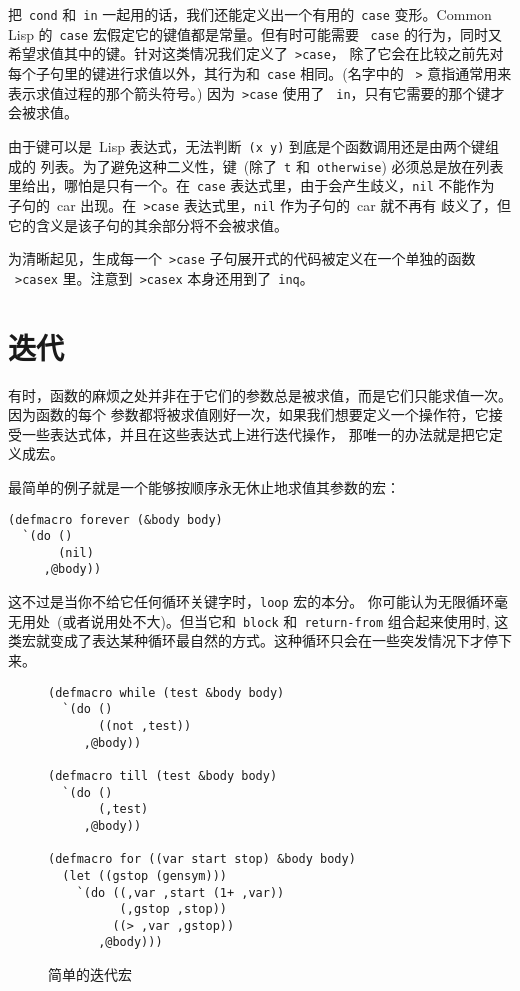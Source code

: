 把~\verb|cond| 和~\verb|in| 一起用的话，我们还能定义出一个有用的~\verb|case| 
变形。Common Lisp 的~\verb|case| 宏假定它的键值都是常量。但有时可能需要
~\texttt{case} 的行为，同时又希望求值其中的键。针对这类情况我们定义了~\texttt{>case}，
除了它会在比较之前先对每个子句里的键进行求值以外，其行为和~\texttt{case} 相同。(名字中的
~\texttt{>} 意指通常用来表示求值过程的那个箭头符号。) 因为~\texttt{>case} 使用了
~\texttt{in}，只有它需要的那个键才会被求值。

由于键可以是~Lisp 表达式，无法判断~\verb|(x y)| 到底是个函数调用还是由两个键组成的
列表。为了避免这种二义性，键~(除了~\texttt{t} 和~\texttt{otherwise}) 必须总是放在列表
里给出，哪怕是只有一个。在~\texttt{case} 表达式里，由于会产生歧义，\texttt{nil} 不能作为
子句的~car 出现。在~\texttt{>case} 表达式里，\texttt{nil} 作为子句的~car 就不再有
歧义了，但它的含义是该子句的其余部分将不会被求值。

为清晰起见，生成每一个~\texttt{>case} 子句展开式的代码被定义在一个单独的函数
~\texttt{>casex} 里。注意到~\texttt{>casex} 本身还用到了~\texttt{inq}。

\section{迭代}
\label{sec:iteration}

有时，函数的麻烦之处并非在于它们的参数总是被求值，而是它们只能求值一次。因为函数的每个
参数都将被求值刚好一次，如果我们想要定义一个操作符，它接受一些表达式体，并且在这些表达式上进行迭代操作，
那唯一的办法就是把它定义成宏。

最简单的例子就是一个能够按顺序永无休止地求值其参数的宏：
\begin{lstlisting}
(defmacro forever (&body body)
  `(do ()
       (nil)
     ,@body))
\end{lstlisting}
这不过是当你不给它任何循环关键字时，\texttt{loop} 宏的本分。
你可能认为无限循环毫无用处~(或者说用处不大)。但当它和~\texttt{block} 和~\texttt{return-from}
组合起来使用时, 这类宏就变成了表达某种循环最自然的方式。这种循环只会在一些突发情况下才停下来。

\begin{figure}
\begin{lstlisting}
(defmacro while (test &body body)
  `(do ()
       ((not ,test))
     ,@body))

(defmacro till (test &body body)
  `(do ()
       (,test)
     ,@body))

(defmacro for ((var start stop) &body body)
  (let ((gstop (gensym)))
    `(do ((,var ,start (1+ ,var))
          (,gstop ,stop))
         ((> ,var ,gstop))
       ,@body)))
\end{lstlisting}
  \caption{简单的迭代宏}
  \label{fig:simple_iteration_macros} 
\end{figure}

